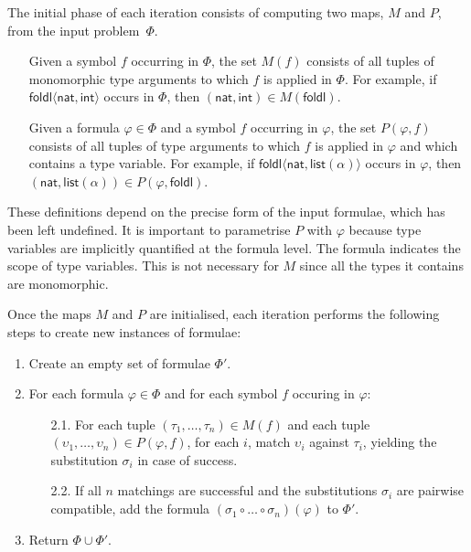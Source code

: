 \documentclass[]{ceurart}
\newcommand\ty[1]{\textsf{#1}}
\newcommand\sym[1]{\textsf{#1}}
\begin{document}
The initial phase of each iteration consists of computing two maps, \(M\) and \(P\), from the input problem~$\Phi$.
%
\begin{enumerate}
\item[\labelitemi] Given a symbol \(f\) occurring in \(\Phi\), the set \(M(f)\) consists of all tuples of monomorphic type arguments to which \(f\) is applied in \(\Phi\). For example, if \(\sym{foldl}\langle \ty{nat}, \ty{int}\rangle\) occurs in \(\Phi\), then \((\ty{nat}, \ty{int}) \in M(\sym{foldl}) \).

\item[\labelitemi] Given a formula \(\varphi \in \Phi\) and a symbol \(f\) occurring in \(\varphi\), the set \(P(\varphi, f)\) consists of all tuples of type arguments to which \(f\) is applied in \(\varphi\) and which contains a type variable. For example, if \(\sym{foldl}\langle \ty{nat}, \ty{list}(\alpha)\rangle\) occurs in \(\varphi\), then \((\ty{nat}, \ty{list}(\alpha)) \in P(\varphi, \sym{foldl}) \).
\end{enumerate}

These definitions depend on the precise form of the input formulae, which has been left undefined. It is important to parametrise \(P\) with \(\varphi\) because type variables are implicitly quantified at the formula level. The formula indicates the scope of type variables. This is not necessary for \(M\) since all the types it contains are monomorphic.

Once the maps \(M\) and \(P\) are initialised, each iteration performs the following steps to create new instances of formulae:

\begin{enumerate}

   \item Create an empty set of formulae \(\Phi'\).

   \item For each formula \(\varphi \in \Phi\) and for each symbol \(f\) occuring in \(\varphi\):
   \begin{enumerate}
    \item[2.1.] For each tuple \((\tau_1, \dots, \tau_n) \in  M(f)\)        and each tuple \((\upsilon_1, \dots, \upsilon_n) \in P(\varphi, f)\),
     for each \(i\), match \(\upsilon_i\) against \(\tau_i\), yielding the substitution \(\sigma_i\) in case of success.

    \item[2.2.] If all \(n\) matchings are successful and the substitutions \(\sigma_i\) are pairwise compatible,
add the formula \((\sigma_1 \circ \dots \circ \sigma_n)(\varphi)\) to \(\Phi'\).
   \end{enumerate}

   \item Return \(\Phi \cup \Phi'\).

\end{enumerate}
\end{document}
